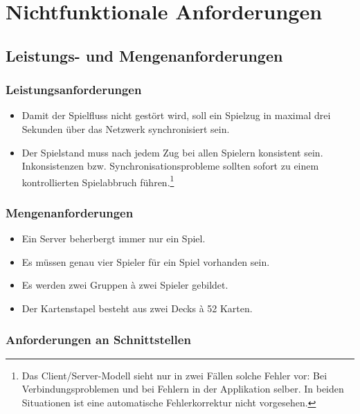 \documentclass[a4paper,12pt,halfparskip,DIV14]{scrartcl}
\begin{document}
\newpage

\section{Nichtfunktionale Anforderungen}\label{cha:nichtfunktionale_anforderungen} %

\subsection{Leistungs- und Mengenanforderungen}\label{sub:leistungs_und_mengenanforderungen} %
\subsubsection{Leistungsanforderungen}\label{ssub:leistungsanforderungen} %
\begin{itemize}
	\item Damit der Spielfluss nicht gestört wird, soll ein Spielzug in maximal drei Sekunden über das Netzwerk synchronisiert sein.
	\item Der Spielstand muss nach jedem Zug bei allen Spielern konsistent sein. Inkonsistenzen bzw. Synchronisationsprobleme sollten sofort zu einem kontrollierten Spielabbruch führen.\footnote{Das Client/Server-Modell sieht nur in zwei Fällen solche Fehler vor: Bei Verbindungsproblemen und bei Fehlern in der Applikation selber. In beiden Situationen ist eine automatische Fehlerkorrektur nicht vorgesehen.}
\end{itemize}
\subsubsection{Mengenanforderungen}\label{ssub:mengenanforderungen} %
\begin{itemize}
	\item Ein Server beherbergt immer nur ein Spiel.
	\item Es müssen genau vier Spieler für ein Spiel vorhanden sein.
	\item Es werden zwei Gruppen à zwei Spieler gebildet.
	\item Der Kartenstapel besteht aus zwei Decks à 52 Karten.
\end{itemize}

\subsubsection{Anforderungen an Schnittstellen}\label{ssub:anforderungen_an_schnittstellen} %
\end{document}
